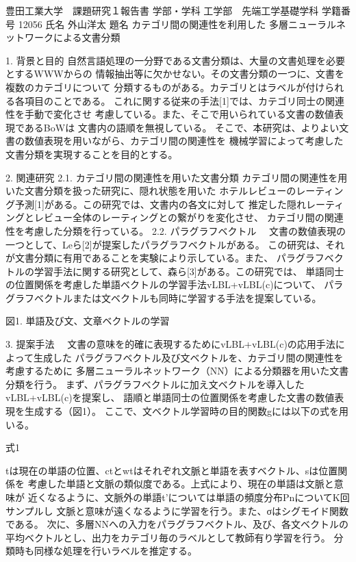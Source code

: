 \documentclass[12pt, unicode]{beamer}
\begin{document}
豊田工業大学　課題研究１報告書
学部・学科
工学部　先端工学基礎学科
学籍番号
12056
氏名
外山洋太
題名
カテゴリ間の関連性を利用した
多層ニューラルネットワークによる文書分類


1. 背景と目的
自然言語処理の一分野である文書分類は、大量の文書処理を必要とするWWWからの
情報抽出等に欠かせない。その文書分類の一つに、文書を複数のカテゴリについて
分類するものがある。カテゴリとはラベルが付けられる各項目のことである。
これに関する従来の手法[1]では、カテゴリ同士の関連性を手動で変化させ
考慮している。また、そこで用いられている文書の数値表現であるBoWは
文書内の語順を無視している。
そこで、本研究は、よりよい文書の数値表現を用いながら、カテゴリ間の関連性を
機械学習によって考慮した文書分類を実現することを目的とする。


2. 関連研究
2.1. カテゴリ間の関連性を用いた文書分類
カテゴリ間の関連性を用いた文書分類を扱った研究に、隠れ状態を用いた
ホテルレビューのレーティング予測[1]がある。この研究では、文書内の各文に対して
推定した隠れレーティングとレビュー全体のレーティングとの繋がりを変化させ、
カテゴリ間の関連性を考慮した分類を行っている。
2.2. パラグラフベクトル
　文書の数値表現の一つとして、Leら[2]が提案したパラグラフベクトルがある。
この研究は、それが文書分類に有用であることを実験により示している。また、
パラグラフベクトルの学習手法に関する研究として、森ら[3]がある。この研究では、
単語同士の位置関係を考慮した単語ベクトルの学習手法vLBL+vLBL(c)について、
パラグラフベクトルまたは文ベクトルも同時に学習する手法を提案している。

図1. 単語及び文、文章ベクトルの学習


3. 提案手法
　文書の意味を的確に表現するためにvLBL+vLBL(c)の応用手法によって生成した
パラグラフベクトル及び文ベクトルを、カテゴリ間の関連性を考慮するために
多層ニューラルネットワーク（NN）による分類器を用いた文書分類を行う。
まず、パラグラフベクトルに加え文ベクトルを導入したvLBL+vLBL(c)を提案し、
語順と単語同士の位置関係を考慮した文書の数値表現を生成する（図1）。
ここで、文ベクトル学習時の目的関数gには以下の式を用いる。

式1

tは現在の単語の位置、ctとwtはそれぞれ文脈と単語を表すベクトル、sは位置関係を
考慮した単語と文脈の類似度である。上式により、現在の単語は文脈と意味が
近くなるように、文脈外の単語t'については単語の頻度分布PnについてK回サンプルし
文脈と意味が遠くなるように学習を行う。また、σはシグモイド関数である。
次に、多層NNへの入力をパラグラフベクトル、及び、各文ベクトルの
平均ベクトルとし、出力をカテゴリ毎のラベルとして教師有り学習を行う。
分類時も同様な処理を行いラベルを推定する。
\end{document}
